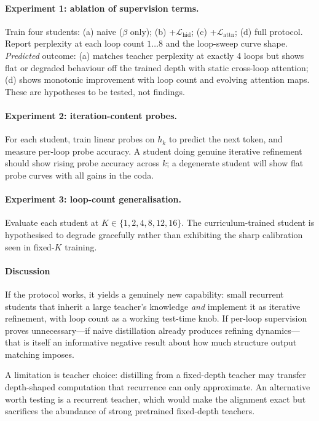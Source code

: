 \paragraph{Experiment 1: ablation of supervision terms.} Train four
students: (a) naive ($\beta$ only); (b) +$\mathcal{L}_{\mathrm{hid}}$;
(c) +$\mathcal{L}_{\mathrm{attn}}$; (d) full protocol. Report
perplexity at each loop count $1\ldots8$ and the loop-sweep curve
shape. \emph{Predicted} outcome: (a) matches teacher perplexity at
exactly 4 loops but shows flat or degraded behaviour off the trained
depth with static cross-loop attention; (d) shows monotonic
improvement with loop count and evolving attention maps. These are
hypotheses to be tested, not findings.

\paragraph{Experiment 2: iteration-content probes.} For each student,
train linear probes on $h_k$ to predict the next token, and measure
per-loop probe accuracy. A student doing genuine iterative refinement
should show rising probe accuracy across $k$; a degenerate student
will show flat probe curves with all gains in the coda.

\paragraph{Experiment 3: loop-count generalisation.} Evaluate each
student at $K \in \{1, 2, 4, 8, 12, 16\}$. The curriculum-trained
student is hypothesised to degrade gracefully rather than exhibiting
the sharp calibration seen in fixed-$K$ training.

\paragraph{Discussion}

If the protocol works, it yields a genuinely new capability: small
recurrent students that inherit a large teacher's knowledge
\emph{and} implement it as iterative refinement, with loop count as a
working test-time knob. If per-loop supervision proves unnecessary---if
naive distillation already produces refining dynamics---that is itself
an informative negative result about how much structure output
matching imposes.

A limitation is teacher choice: distilling from a fixed-depth teacher
may transfer depth-shaped computation that recurrence can only
approximate. An alternative worth testing is a recurrent teacher,
which would make the alignment exact but sacrifices the abundance of
strong pretrained fixed-depth teachers.

